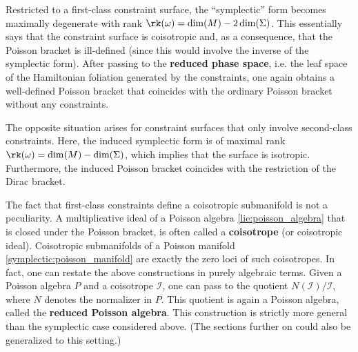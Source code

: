
    \begin{property}
        Restricted to a first-class constraint surface, the ``symplectic'' form becomes maximally degenerate with rank $\rk(\omega) = \dim(M) - 2\dim(\Sigma)$. This essentially says that the constraint surface is coisotropic and, as a consequence, that the Poisson bracket is ill-defined (since this would involve the inverse of the symplectic form). After passing to the \textbf{reduced phase space}, i.e. the leaf space of the Hamiltonian foliation generated by the constraints, one again obtains a well-defined Poisson bracket that coincides with the ordinary Poisson bracket without any constraints.

        The opposite situation arises for constraint surfaces that only involve second-class constraints. Here, the induced symplectic form is of maximal rank $\rk(\omega) = \dim(M) - \dim(\Sigma)$, which implies that the surface is isotropic. Furthermore, the induced Poisson bracket coincides with the restriction of the Dirac bracket.
    \end{property}
    \begin{remark}
        The fact that first-class constraints define a coisotropic submanifold is not a peculiarity. A multiplicative ideal of a Poisson algebra \ref{lie:poisson_algebra} that is closed under the Poisson bracket, is often called a \textbf{coisotrope} (or coisotropic ideal). Coisotropic submanifolds of a Poisson manifold  \ref{symplectic:poisson_manifold} are exactly the zero loci of such coisotropes. In fact, one can restate the above constructions in purely algebraic terms. Given a Poisson algebra $P$ and a coisotrope $\mathcal{I}$, one can pass to the quotient $N(\mathcal{I})/\mathcal{I}$, where $N$ denotes the normalizer in $P$. This quotient is again a Poisson algebra, called the \textbf{reduced Poisson algebra}. This construction is strictly more general than the symplectic case considered above. (The sections further on could also be generalized to this setting.)
    \end{remark}

